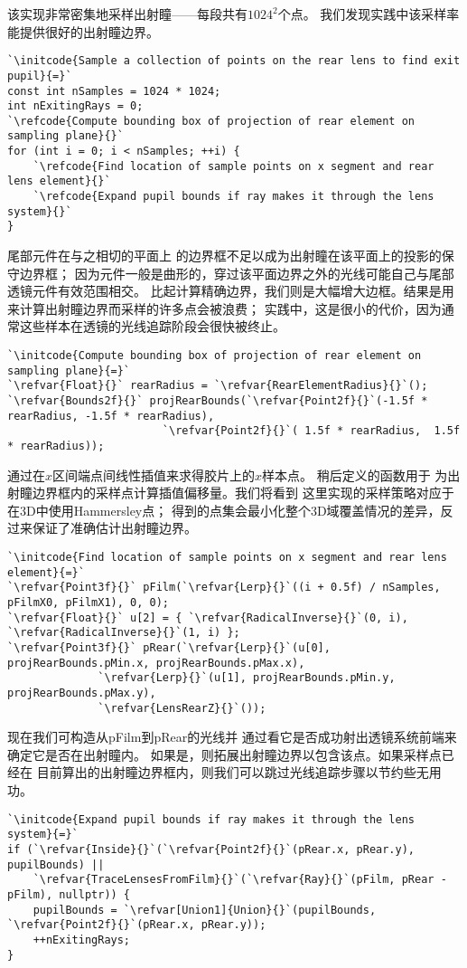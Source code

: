 该实现非常密集地采样出射瞳——每段共有$1024^2$个点。
我们发现实践中该采样率能提供很好的出射瞳边界。
\begin{lstlisting}
`\initcode{Sample a collection of points on the rear lens to find exit pupil}{=}`
const int nSamples = 1024 * 1024;
int nExitingRays = 0;
`\refcode{Compute bounding box of projection of rear element on sampling plane}{}`
for (int i = 0; i < nSamples; ++i) {
    `\refcode{Find location of sample points on x segment and rear lens element}{}`
    `\refcode{Expand pupil bounds if ray makes it through the lens system}{}`
}
\end{lstlisting}

尾部元件在与之相切的平面上
的边界框不足以成为出射瞳在该平面上的投影的保守边界框；
因为元件一般是曲形的，穿过该平面边界之外的光线可能自己与尾部透镜元件有效范围相交。
比起计算精确边界，我们则是大幅增大边框。结果是用来计算出射瞳边界而采样的许多点会被浪费；
实践中，这是很小的代价，因为通常这些样本在透镜的光线追踪阶段会很快被终止。
\begin{lstlisting}
`\initcode{Compute bounding box of projection of rear element on sampling plane}{=}`
`\refvar{Float}{}` rearRadius = `\refvar{RearElementRadius}{}`();
`\refvar{Bounds2f}{}` projRearBounds(`\refvar{Point2f}{}`(-1.5f * rearRadius, -1.5f * rearRadius),
                        `\refvar{Point2f}{}`( 1.5f * rearRadius,  1.5f * rearRadius));
\end{lstlisting}

通过在$x$区间端点间线性插值来求得胶片上的$x$样本点。
稍后定义的函数用于
为出射瞳边界框内的采样点计算插值偏移量。我们将看到
这里实现的采样策略对应于在3D中使用Hammersley点；
得到的点集会最小化整个3D域覆盖情况的差异，反过来保证了准确估计出射瞳边界。
\begin{lstlisting}
`\initcode{Find location of sample points on x segment and rear lens element}{=}`
`\refvar{Point3f}{}` pFilm(`\refvar{Lerp}{}`((i + 0.5f) / nSamples, pFilmX0, pFilmX1), 0, 0);
`\refvar{Float}{}` u[2] = { `\refvar{RadicalInverse}{}`(0, i), `\refvar{RadicalInverse}{}`(1, i) };
`\refvar{Point3f}{}` pRear(`\refvar{Lerp}{}`(u[0], projRearBounds.pMin.x, projRearBounds.pMax.x),
              `\refvar{Lerp}{}`(u[1], projRearBounds.pMin.y, projRearBounds.pMax.y),
              `\refvar{LensRearZ}{}`());
\end{lstlisting}

现在我们可构造从{\ttfamily pFilm}到{\ttfamily pRear}的光线并
通过看它是否成功射出透镜系统前端来确定它是否在出射瞳内。
如果是，则拓展出射瞳边界以包含该点。如果采样点已经在
目前算出的出射瞳边界框内，则我们可以跳过光线追踪步骤以节约些无用功。
\begin{lstlisting}
`\initcode{Expand pupil bounds if ray makes it through the lens system}{=}`
if (`\refvar{Inside}{}`(`\refvar{Point2f}{}`(pRear.x, pRear.y), pupilBounds) ||
    `\refvar{TraceLensesFromFilm}{}`(`\refvar{Ray}{}`(pFilm, pRear - pFilm), nullptr)) {
    pupilBounds = `\refvar[Union1]{Union}{}`(pupilBounds, `\refvar{Point2f}{}`(pRear.x, pRear.y));
    ++nExitingRays;
}
\end{lstlisting}

